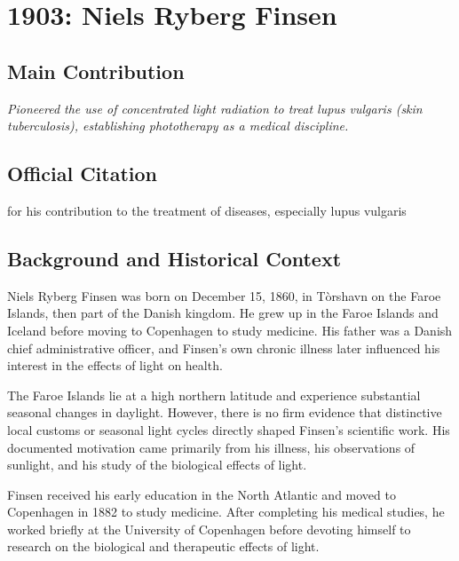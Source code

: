 \chapter[1903 --- Finsen]{1903: Niels Ryberg Finsen}
\label{ch:1903_nielsrybergfinsen}

\section*{Main Contribution}

\textit{Pioneered the use of concentrated light radiation to treat lupus vulgaris (skin tuberculosis), establishing phototherapy as a medical discipline.}\cite{nobel-1903,lecture-1903}

\section{Official Citation}

for his contribution to the treatment of diseases, especially lupus vulgaris

\section{Background and Historical Context}

Niels Ryberg Finsen was born on December 15, 1860, in T\`orshavn on the Faroe Islands, then part of the Danish kingdom. He grew up in the Faroe Islands and Iceland before moving to Copenhagen to study medicine. His father was a Danish chief administrative officer, and Finsen's own chronic illness later influenced his interest in the effects of light on health.\cite{finsen-facts}

The Faroe Islands lie at a high northern latitude and experience substantial seasonal changes in daylight. However, there is no firm evidence that distinctive local customs or seasonal light cycles directly shaped Finsen's scientific work. His documented motivation came primarily from his illness, his observations of sunlight, and his study of the biological effects of light.

Finsen received his early education in the North Atlantic and moved to Copenhagen in 1882 to study medicine. After completing his medical studies, he worked briefly at the University of Copenhagen before devoting himself to research on the biological and therapeutic effects of light.\cite{finsen-facts}

